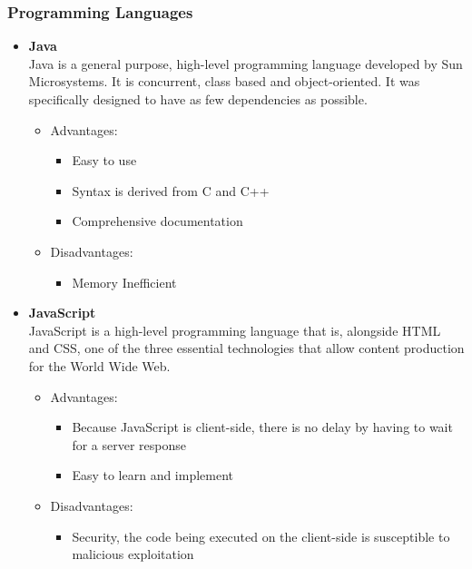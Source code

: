 \documentclass{article}
\begin{document}
	\subsubsection{Programming Languages}
		\begin{itemize}
			\item\textbf{Java}\\
			Java is a general purpose, high-level programming language developed by Sun Microsystems. It is concurrent, class based and object-oriented. It was specifically designed to have as few dependencies as possible.
				
				\begin{itemize}			
					\item Advantages:
						\begin{itemize}
							\item Easy to use
							\item Syntax is derived from C and C++
							\item Comprehensive documentation
						\end{itemize}
						
					\item Disadvantages:
						\begin{itemize}
							\item Memory Inefficient
						\end{itemize}
				\end{itemize}
				
			\item\textbf{JavaScript} \\
			
			JavaScript is a high-level programming language that is, alongside HTML and CSS, one of the three essential technologies that allow content production for the World Wide Web.
				
				\begin{itemize}
					\item Advantages:
						\begin{itemize}
							\item  Because JavaScript is client-side, there is no delay by having to wait for a server response
							\item Easy to learn and implement
						\end{itemize}
						
					\item Disadvantages:
						\begin{itemize}
							\item Security, the code being executed on the client-side is susceptible to malicious exploitation
						\end{itemize}
				\end{itemize}
				

\end{itemize}
\end{document}

